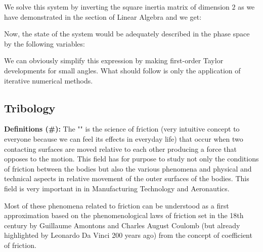 	We solve this system by inverting the square inertia matrix of dimension $2$ as we have demonstrated in the section of Linear Algebra and we get:
	
	Now, the state of the system would be adequately described in the phase space by the following variables:
	
	We can obviously simplify this expression by making first-order Taylor developments for small angles. What should follow is only the application of iterative numerical methods.
	
	\pagebreak
	\subsection{Tribology}
	\textbf{Definitions (\#\mydef):} The "" is the science of friction (very intuitive concept to everyone because we can feel its effects in everyday life) that occur when two contacting surfaces are moved relative to each other producing a force that opposes to the motion. This field has for purpose to study not only the conditions of friction between the bodies but also the various phenomena and physical and technical aspects in relative movement of the outer surfaces of the bodies. This field is very important in in  Manufacturing Technology and Aeronautics.

	Most of these phenomena related to friction can be understood as a first approximation based on the phenomenological laws of friction set in the 18th century by Guillaume Amontons and Charles August Coulomb (but already highlighted by Leonardo Da Vinci 200 years ago) from the concept of coefficient of friction.

